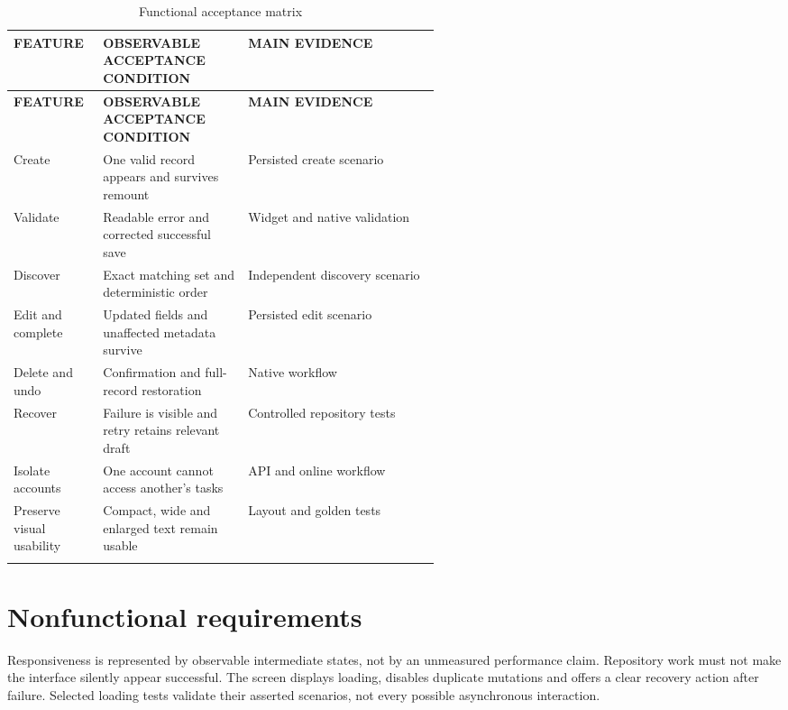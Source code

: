 \documentclass[12pt,a4paper,oneside]{report}
\begin{document}
{\fontsize{11}{14}\selectfont\setlength{\tabcolsep}{4pt}\renewcommand{\arraystretch}{1.15}
\begin{longtable}{@{}>{\raggedright\arraybackslash}p{0.21\linewidth}>{\raggedright\arraybackslash}p{0.34\linewidth}>{\raggedright\arraybackslash}p{}@{}}
\caption{Functional acceptance matrix}\\\toprule
\textbf{FEATURE} & \textbf{OBSERVABLE ACCEPTANCE CONDITION} & \textbf{MAIN EVIDENCE} \\ \midrule
\endfirsthead\toprule
\textbf{FEATURE} & \textbf{OBSERVABLE ACCEPTANCE CONDITION} & \textbf{MAIN EVIDENCE} \\ \midrule
\endhead
Create & One valid record appears and survives remount & Persisted create scenario \\ \addlinespace[5pt]
Validate & Readable error and corrected successful save & Widget and native validation \\ \addlinespace[5pt]
Discover & Exact matching set and deterministic order & Independent discovery scenario \\ \addlinespace[5pt]
Edit and complete & Updated fields and unaffected metadata survive & Persisted edit scenario \\ \addlinespace[5pt]
Delete and undo & Confirmation and full-record restoration & Native workflow \\ \addlinespace[5pt]
Recover & Failure is visible and retry retains relevant draft & Controlled repository tests \\ \addlinespace[5pt]
Isolate accounts & One account cannot access another's tasks & API and online workflow \\ \addlinespace[5pt]
Preserve visual usability & Compact, wide and enlarged text remain usable & Layout and golden tests \\ \addlinespace[5pt]
\bottomrule\end{longtable}}
\section{Nonfunctional requirements}
Responsiveness is represented by observable intermediate states, not by an unmeasured performance claim. Repository work must not make the interface silently appear successful. The screen displays loading, disables duplicate mutations and offers a clear recovery action after failure. Selected loading tests validate their asserted scenarios, not every possible asynchronous interaction.
\end{document}
